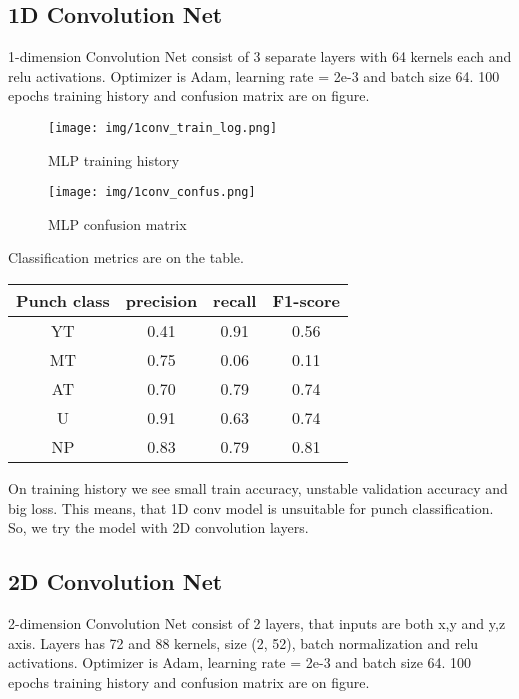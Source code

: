 \documentclass[sport,article,submit,moreauthors,pdftex]{Definitions/mdpi}
\begin{document}

\subsection{1D Convolution Net}
1-dimension Convolution Net consist of 3 separate layers with 64 kernels each and relu activations. 
Optimizer is Adam, learning rate = 2e-3 and batch size 64.
100 epochs training history and confusion matrix are on figure.

\begin{figure}[H]
\texttt{[image: img/1conv\_train\_log.png]}
\caption{MLP training history}
\end{figure} 

\begin{figure}[H]
\texttt{[image: img/1conv\_confus.png]}
\caption{MLP confusion matrix}
\end{figure} 

Classification metrics are on the table.

\begin{specialtable}[H] 
\caption{This is a table caption. Tables should be placed in the main text near to the first time they are~cited.\label{tab1}}
\begin{tabular}{cccc}
\toprule
\textbf{Punch class}	& \textbf{precision}	& \textbf{recall}	& \textbf{F1-score}\\
\midrule
YT		& 0.41		& 0.91		& 0.56 \\
MT		& 0.75		& 0.06		& 0.11 \\
AT		& 0.70		& 0.79		& 0.74 \\
U		& 0.91		& 0.63		& 0.74 \\
NP		& 0.83		& 0.79		& 0.81 \\
\bottomrule
\end{tabular}
\end{specialtable}

On training history we see small train accuracy, unstable validation accuracy and big loss.
This means, that 1D conv model is unsuitable for punch classification.
So, we try the model with 2D convolution layers.


\subsection{2D Convolution Net}
2-dimension Convolution Net consist of 2 layers, that inputs are both x,y and y,z axis. Layers has  72 and 88 kernels, size (2, 52), batch normalization and relu activations. 
Optimizer is Adam, learning rate = 2e-3 and batch size 64.
100 epochs training history and confusion matrix are on figure.
\end{document}
